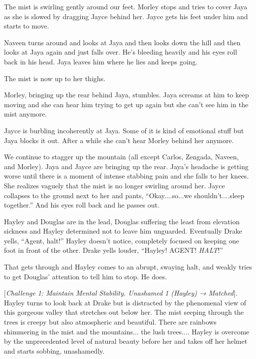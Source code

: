 The mist is swirling gently around our feet.  Morley stops and tries to cover Jaya as she is slowed by dragging Jayce behind her.  Jayce gets his feet under him and starts to move. 

Naveen turns around and looks at Jaya and then looks down the hill and then looks at Jaya again and just falls over.  He's bleeding heavily and his eyes roll back in his head.  Jaya leaves him where he lies and keeps going.

The mist is now up to her thighs.  

Morley, bringing up the rear behind Jaya, stumbles.  Jaya screams at him to keep moving and she can hear him trying to get up again but she can't see him in the mist anymore.  

Jayce is burbling incoherently at Jaya. Some of it is kind of emotional stuff but Jaya blocks it out.  After a while she can't hear Morley behind her anymore.



We continue to stagger up the mountain (all except Carlos, Zengada, Naveen, and Morley).  Jaya and Jayce are bringing up the rear.  Jaya's headache is getting worse until there is a moment of intense stabbing pain and she falls to her knees.  She realizes vaguely that the mist is no longer swirling around her.  Jayce collapses to the ground next to her and pants, ``Okay....so...we shouldn't....sleep together.''  And his eyes roll back and he passes out.

Hayley and Douglas are in the lead, Douglas suffering the least from elevation sickness and Hayley determined not to leave him unguarded.  Eventually Drake yells, ``Agent, halt!''  Hayley doesn't notice, completely focused on keeping one foot in front of the other.  Drake yells louder, ``Hayley!  AGENT!  \textit{HALT}!''

That gets through and Hayley comes to an abrupt, swaying halt, and weakly tries to get Douglas' attention to tell him to stop.  He does.



{[}\textit{Challenge 1: Maintain Mental Stability.  Unashamed 1 (Hayley) → Matched}{]}.  Hayley turns to look back at Drake but is distracted by the phenomenal view of this gorgeous valley that stretches out below her.  The mist seeping through the trees is creepy but also atmospheric and beautiful.  There are rainbows shimmering in the mist and the mountains... the lush trees....  Hayley is overcome by the unprecedented level of natural beauty before her and takes off her helmet and starts sobbing, unashamedly.

